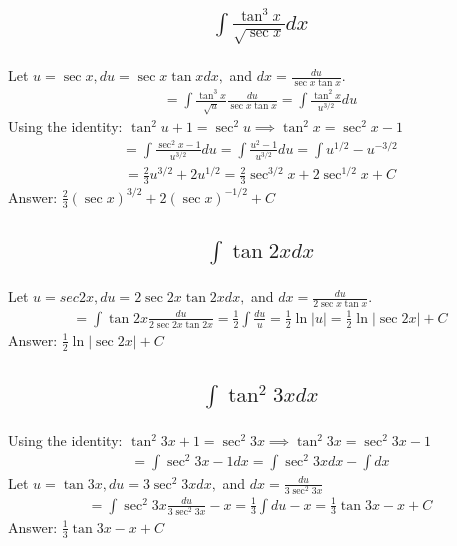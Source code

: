 \documentclass{article}
\begin{document}
\subsection{
	\begin{align*}
		\int{\frac{\tan^3{x}}{\sqrt{\sec{x}}} dx}
	\end{align*}
}
Let $u = \sec{x}, du = \sec{x}\tan{x} dx,$ and $dx = \frac{du}{\sec{x} \tan{x}}$.
\begin{align*}
	= \int{\frac{\tan^3{x}}{\sqrt{u}} \frac{du}{\sec{x} \tan{x}}} = \int{\frac{\tan^2{x}}{u^{3/2}} du}
\end{align*}
Using the identity: $\tan^2{u} + 1 = \sec^2{u} \implies \tan^2{x} = \sec^2{x} - 1$
\begin{align*}
	= \int{\frac{\sec^2{x} - 1}{u^{3/2}}du} = \int{\frac{u^2 - 1}{u^{3/2}}du} = \int{u^{1/2} - u^{-3/2}}
\end{align*}
\begin{align*}
	= \frac{2}{3} u^{3/2} + 2 u^{1/2} = \frac{2}{3} \sec^{3/2}{x} + 2\sec^{1/2}{x} + C
\end{align*}
Answer: $\frac{2}{3} (\sec{x})^{3/2} + 2(\sec{x})^{-1/2} + C$

\subsection{
	\begin{align*}
		\int{\tan{2x} dx}
	\end{align*}
}
Let $u = sec{2x}, du = 2\sec{2x} \tan{2x} dx,$ and $dx = \frac{du}{2\sec{x} \tan{x}}$.
\begin{align*}
	= \int{\tan{2x} \frac{du}{2 \sec{2x} \tan{2x}}} = \frac{1}{2} \int{\frac{du}{u}} = \frac{1}{2} \ln{|u|} = \frac{1}{2} \ln{|\sec{2x}|} + C
\end{align*}
Answer: $\frac{1}{2} \ln{ | \sec{2x} | + C}$

\subsection{
	\begin{align*}
		\int{\tan^2{3x} dx}
	\end{align*}
}
Using the identity: $\tan^2{3x} + 1 = \sec^2{3x} \implies \tan^2{3x} = \sec^2{3x} - 1$
\begin{align*}
	= \int{\sec^2{3x} - 1 dx} = \int{\sec^2{3x}dx} - \int{dx}
\end{align*}
Let $u = \tan{3x}, du = 3\sec^2{3x}dx,$ and $dx = \frac{du}{3\sec^2{3x}}$
\begin{align*}
	= \int{\sec^2{3x} \frac{du}{3\sec^2{3x}}} - x = \frac{1}{3}\int{du} - x = \frac{1}{3}\tan{3x} - x + C
\end{align*}
Answer: $\frac{1}{3} \tan{3x} - x + C$
\end{document}
